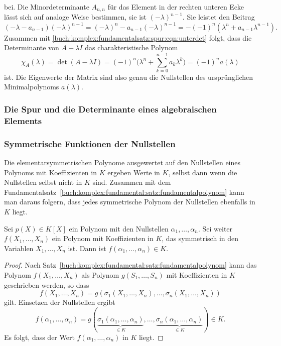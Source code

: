 bei.
Die Minordeterminante $A_{n,n}$ für das Element in der rechten
unteren Ecke lässt sich auf analoge Weise bestimmen, sie ist
$(-\lambda)^{n-1}$.
Sie leistet den Beitrag
\[
(-\lambda-a_{n-1})(-\lambda)^{n-1}
=
(-\lambda)^n - a_{n-1}(-\lambda)^{n-1}
=
-
(-1)^n
(\lambda^n + a_{n-1}\lambda^{n-1}).
\]
Zusammen mit \eqref{buch:komplex:fundamentalsatz:spur:eqn:unterdet}
folgt, dass die Determinante von $A-\lambda I$ das charakteristische
Polynom
\[
\chi_A(\lambda)
=
\det (A-\lambda I)
=
(-1)^n\biggl(
\lambda^n
+
\sum_{k=0}^{n-1} a_k \lambda^k
\biggr)
=
(-1)^n a(\lambda)
\]
ist.
Die Eigenwerte der Matrix sind also genau die Nullstellen des
ursprünglichen Minimalpolynoms $a(\lambda)$.

%
%
\subsubsection{Die Spur und die Determinante eines algebraischen Elements}

%
%
\subsubsection{Symmetrische Funktionen der Nullstellen}
Die elementarsymmetrischen Polynome ausgewertet auf den Nullstellen
eines Polynoms mit Koeffizienten in $K$ ergeben Werte in $K$, selbst
dann wenn die Nullstellen selbst nicht in $K$ sind.
Zusammen mit dem
Fundamentalsatz~\ref{buch:komplex:fundamental:satz:fundamentalpolynom}
kann man daraus folgern, dass jedes symmetrische Polynom der Nullstellen
ebenfalls in $K$ liegt.

\begin{satz}
Sei $p(X)\in K[X]$ ein Polynom mit den Nullstellen
$\alpha_1,\dots,\alpha_n$.
Sei weiter $f(X_1,\dots,X_n)$ ein Polynom mit Koeffizienten in $K$,
das symmetrisch in den Variablen $X_1,\dots,X_n$ ist.
Dann ist $f(\alpha_1,\dots,\alpha_n)\in K$.
\end{satz}

\begin{proof}
Nach Satz~\ref{buch:komplex:fundamental:satz:fundamentalpolynom}
kann das Polynom $f(X_1,\dots,X_n)$ als Polynom $g(S_1,\dots,S_n)$
mit Koeffizienten in $K$ geschrieben werden, so dass
\[
f(X_1,\dots,X_n)
=
g(\sigma_1(X_1,\dots,X_n),\dots,\sigma_n(X_1,\dots,X_n))
\]
gilt.
Einsetzen der Nullstellen ergibt
\[
f(\alpha_1,\dots,\alpha_n)
=
g(
\underbrace{\sigma_1(\alpha_1,\dots,\alpha_n)}_{\displaystyle\in K}
,\dots,
\underbrace{\sigma_n(\alpha_1,\dots,\alpha_n)}_{\displaystyle\in K}
)
\in K.
\]
Es folgt, dass der Wert $f(\alpha_1,\dots,\alpha_n)$ in $K$ liegt.
\end{proof}

